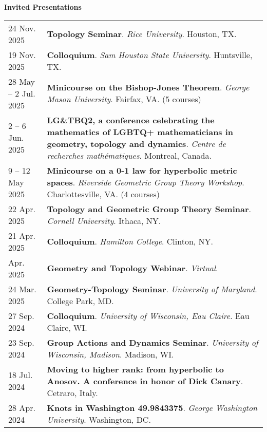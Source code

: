 
    \medskip


    \medskip
    \medskip



    \textbf{\large Invited Presentations}
    
    \begin{center}
    {
    \renewcommand{\arraystretch}{1.5}
    \begin{longtable}{p{}  p{}}
    24 Nov.  2025 & \textbf{Topology Seminar}. \textit{Rice University}.  Houston, TX.  \\ 
19 Nov.  2025 & \textbf{Colloquium}. \textit{Sam Houston State University}.  Huntsville, TX.  \\ 
28 May  -- 2 Jul.  2025 & \textbf{Minicourse on the Bishop-Jones Theorem}. \textit{George Mason University}.  Fairfax, VA. (5 courses) \\ 
2  -- 6 Jun.  2025 & \textbf{LG\&TBQ2, a conference celebrating the mathematics of LGBTQ+ mathematicians in geometry, topology and dynamics}. \textit{Centre de recherches math\'ematiques}.  Montreal, Canada.  \\ 
9  -- 12 May  2025 & \textbf{Minicourse on a 0-1 law for hyperbolic metric spaces}. \textit{Riverside Geometric Group Theory Workshop}.  Charlottesville, VA. (4 courses) \\ 
22 Apr.  2025 & \textbf{Topology and Geometric Group Theory Seminar}. \textit{Cornell University}.  Ithaca, NY.  \\ 
21 Apr.  2025 & \textbf{Colloquium}. \textit{Hamilton College}.  Clinton, NY.  \\ 
 Apr.  2025 & \textbf{Geometry and Topology Webinar}. \textit{Virtual}.  \\ 
24 Mar.  2025 & \textbf{Geometry-Topology Seminar}. \textit{University of Maryland}.  College Park, MD.  \\ 
27 Sep.  2024 & \textbf{Colloquium}. \textit{University of Wisconsin, Eau Claire}.  Eau Claire, WI.  \\ 
23 Sep.  2024 & \textbf{Group Actions and Dynamics Seminar}. \textit{University of Wisconsin, Madison}.  Madison, WI.  \\ 
18 Jul.  2024 & \textbf{Moving to higher rank: 
from hyperbolic to Anosov.
A conference in honor of Dick Canary}.  Cetraro, Italy.  \\ 
28 Apr.  2024 & \textbf{Knots in Washington 49.9843375}. \textit{George Washington University}.  Washington, DC.  \\ 

\end{longtable}}
\end{center}
